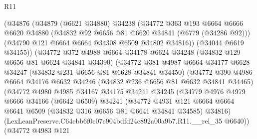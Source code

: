 \begin{lexlean}{R11}
\begin{coremodule}
                    (@34876
                      (@34879
                        (@6621 @34880)
                        @34238
                        (@34772
                          @363
                          @193
                          @6664
                          @6666
                          @6620
                          @34880
                          (@34832 @92 @6656 @81 @6620 @34841 (@6779 (@34286 @92)))
                          (@34790 @121 @6664 @6664 @34308 @6509 @34802 @34816))
                        (@34044 @6619 @34155))
                      (@34772
                        @372
                        @4988
                        @6664
                        @34178
                        @6624
                        @34248
                        (@34832 @129 @6656 @81 @6624 @34841 @34390)
                        (@34772
                          @381
                          @4987
                          @6664
                          @34177
                          @6628
                          @34247
                          (@34832 @231 @6656 @81 @6628 @34841 @34450)
                          (@34772
                            @390
                            @4986
                            @6664
                            @34176
                            @6632
                            @34246
                            (@34832 @236 @6656 @81 @6632 @34841 @34465)
                            (@34772
                              @4980
                              @4985
                              @34167
                              @34175
                              @34241
                              @34245
                              (@34779
                                @4976
                                @4979
                                @6666
                                @34166
                                (@6642 @6509)
                                @34241
                                (@34772
                                  @4931
                                  @121
                                  @6664
                                  @6664
                                  @6641
                                  @6509
                                  (@34832 @316 @6656 @81 @6641 @34841 @34585)
                                  @34816)
                                (LexLeanPreserve.C64ebb6f0c07e904bdfd24c892a00a9b7.R11.__rel_35
                                  @6640))
                              (@34772
                                @4983
                                @121

\end{coremodule}
\end{lexlean}
